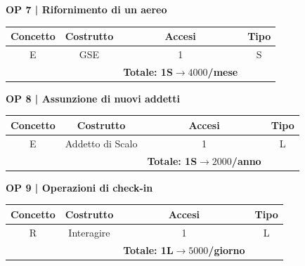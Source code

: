 \vspace{.6cm}



\newpage %

\textbf{\small OP 7 | Rifornimento di un aereo}\\

\begin{tabular}{ c c c c}
	\hline
	\textbf{Concetto} & \textbf{Costrutto} & \textbf{Accesi} & \textbf{Tipo}\\
	\hline
	\textsf{\small E} & \textsf{\small GSE} & \textsf{\small 1} &  \textsf{\small S}\\
	\hline
	\textsf{\small } & \textsf{\small } & \textbf{Totale: 1S$\rightarrow 4000$/mese } \textsf{\small } & \textsf{\small }\\
	\hline
\end{tabular}

\vspace{.6cm}


\textbf{\small OP 8 | Assunzione di nuovi addetti}\\

\begin{tabular}{ c c c c}
	\hline
	\textbf{Concetto} & \textbf{Costrutto} & \textbf{Accesi} & \textbf{Tipo}\\
	\hline
	\textsf{\small E} & \textsf{\small Addetto di Scalo} & \textsf{\small 1} &  \textsf{\small L}\\ %
	\hline
	\textsf{\small } & \textsf{\small } & \textbf{Totale: 1S$\rightarrow 2000$/anno } \textsf{\small } & \textsf{\small }\\ %
	\hline
\end{tabular}

\vspace{.6cm}


\textbf{\small OP 9 | Operazioni di check-in }\\

\begin{tabular}{ c c c c} %
	\hline
	\textbf{Concetto} & \textbf{Costrutto} & \textbf{Accesi} & \textbf{Tipo}\\
	\hline
	\textsf{\small R} & \textsf{\small Interagire} & \textsf{\small 1} &  \textsf{\small L}\\
	\hline
	\textsf{\small } & \textsf{\small } & \textbf{Totale: 1L$\rightarrow 5000$/giorno } \textsf{\small } & \textsf{\small }\\
	\hline
\end{tabular}

